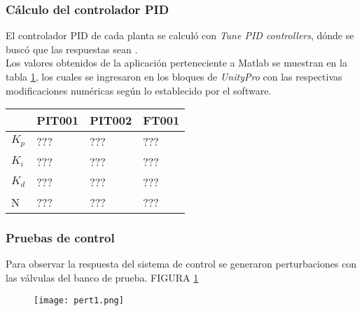 \begin{comment}
		\end{table}


Las funciones de transferencia calculadas son:
\fcolorbox{red}{yellow}{poner ecuaciones}
\end{comment}
\subsubsection{Cálculo del controlador PID}
El controlador PID de cada planta se calculó con \textit{Tune PID controllers}, dónde se buscó que las respuestas sean .\\

Los valores obtenidos de la aplicación perteneciente a Matlab se muestran en la tabla \ref{tab:pid}, los cuales se ingresaron en los bloques de \textit{UnityPro} con las respectivas modificaciones numéricas según lo establecido por el software.
\begin{comment}
Se observa que algunos de los controladores PID son del tipo proporcional integrador, dando así ya que la ganancia en los diferentes escalones en la planta no era constante. Al utilizar un PI genera una salida con error de estado estacionario cero. 
\end{comment}

\begin{table}[h]
	\centering
	\begin{tabular}{|l|l|l|l|}
		\hline
		& PIT001 & PIT002 & FT001 \\ \hline
		$K_p$ & ??? & ??? & ??? \\ \hline
		$K_i$ & ??? & ??? & ??? \\ \hline
		$K_d$ & ??? & ??? & ??? \\ \hline
		N & ??? & ??? & ??? \\ \hline
	\end{tabular}
	\label{tab:pid}
\end{table}

\subsubsection{Pruebas de control}
Para observar la respuesta del sistema de control se generaron perturbaciones con las válvulas del banco de prueba. FIGURA \ref{fig:pert1}
\begin{figure}[htb]
	\centering
	\texttt{[image: pert1.png]}
	\label{fig:pert1}
\end{figure}



